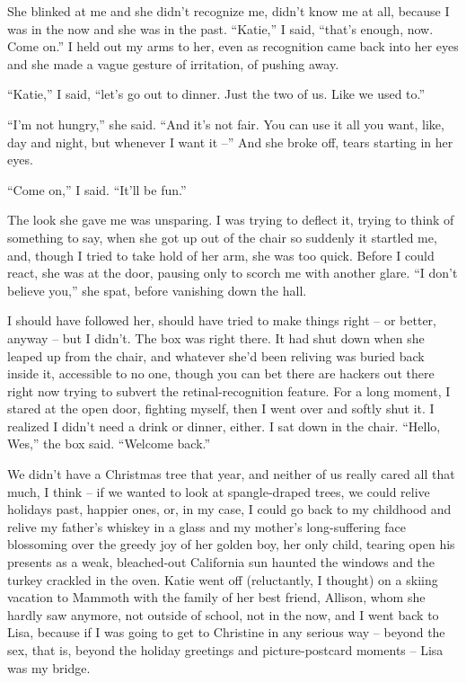 \documentclass[11pt,a4paper]{article}
\newcommand{\qm}[1]{“#1”}
\begin{document}
She blinked at me and she didn't recognize me, didn't know me at all, because I was in the now and she was in the past. \qm{Katie,} I said, \qm{that's enough, now. Come on.} I held out my arms to her, even as recognition came back into her eyes and she made a vague gesture of irritation, of pushing away.

\qm{Katie,} I said, \qm{let's go out to dinner. Just the two of us. Like we used to.}

\qm{I'm not hungry,} she said. \qm{And it's not fair. You can use it all you want, like, day and night, but whenever I want it –} And she broke off, tears starting in her eyes.

\qm{Come on,} I said. \qm{It'll be fun.}

The look she gave me was unsparing. I was trying to deflect it, trying to think of something to say, when she got up out of the chair so suddenly it startled me, and, though I tried to take hold of her arm, she was too quick. Before I could react, she was at the door, pausing only to scorch me with another glare. \qm{I don't believe you,} she spat, before vanishing down the hall.

I should have followed her, should have tried to make things right – or better, anyway – but I didn't. The box was right there. It had shut down when she leaped up from the chair, and whatever she'd been reliving was buried back inside it, accessible to no one, though you can bet there are hackers out there right now trying to subvert the retinal-recognition feature. For a long moment, I stared at the open door, fighting myself, then I went over and softly shut it. I realized I didn't need a drink or dinner, either. I sat down in the chair. \qm{Hello, Wes,} the box said. \qm{Welcome back.}

We didn't have a Christmas tree that year, and neither of us really cared all that much, I think – if we wanted to look at spangle-draped trees, we could relive holidays past, happier ones, or, in my case, I could go back to my childhood and relive my father's whiskey in a glass and my mother's long-suffering face blossoming over the greedy joy of her golden boy, her only child, tearing open his presents as a weak, bleached-out California sun haunted the windows and the turkey crackled in the oven. Katie went off (reluctantly, I thought) on a skiing vacation to Mammoth with the family of her best friend, Allison, whom she hardly saw anymore, not outside of school, not in the now, and I went back to Lisa, because if I was going to get to Christine in any serious way – beyond the sex, that is, beyond the holiday greetings and picture-postcard moments – Lisa was my bridge.
\end{document}
